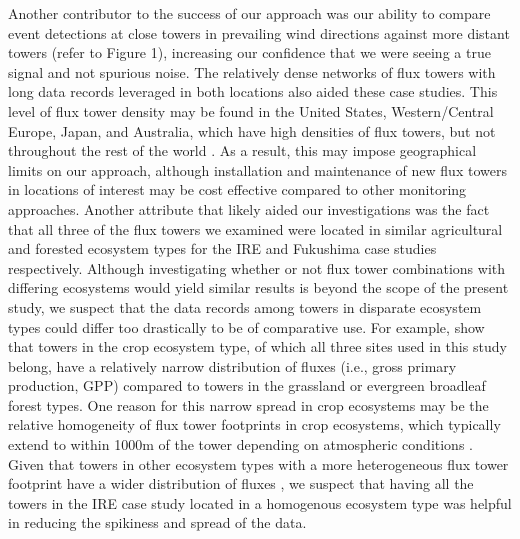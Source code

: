 \documentclass{article}
\begin{document}
Another contributor to the success of our approach was our ability to compare event detections at  close towers in prevailing wind directions against more distant towers (refer to Figure 1), increasing our confidence that we were seeing a true signal and not spurious noise. The relatively dense networks of flux towers with long data records leveraged in both locations also aided these case studies. This level of flux tower density may be found in the United States, Western/Central Europe, Japan, and Australia, which have high densities of flux towers, but not throughout the rest of the world \citep{baldocchi2001fluxnet,pastorello2020fluxnet2015}. As a result, this may impose geographical limits on our approach, although installation and maintenance of new flux towers in locations of interest may be cost effective compared to other monitoring approaches. Another attribute that likely aided our investigations was the fact that all three of the flux towers we examined were located in similar agricultural and forested ecosystem types for the IRE and Fukushima case studies respectively. Although investigating whether or not flux tower combinations with differing ecosystems would yield similar results is beyond the scope of the present study, we suspect that the data records among towers in disparate ecosystem types could differ too drastically to be of comparative use. For example, \citet{pastorello2020fluxnet2015} show that towers in the crop ecosystem type, of which all three sites used in this study belong, have a relatively narrow distribution of fluxes (i.e., gross primary production, GPP) compared to towers in the grassland or evergreen broadleaf forest types. One reason for this narrow spread in crop ecosystems may be the relative homogeneity of flux tower footprints in crop ecosystems, which typically extend to within 1000m of the tower depending on atmospheric conditions \citep[e.g., wind speed and direction,][]{chuRepresentativenessEddyCovarianceFlux2021}. Given that towers in other ecosystem types with a more heterogeneous flux tower footprint have a wider distribution of fluxes \citep[e.g.][]{pastorello2020fluxnet2015}, we suspect that having all the towers in the IRE case study located in a homogenous ecosystem type was helpful in reducing the spikiness and spread of the data. 
\end{document}

